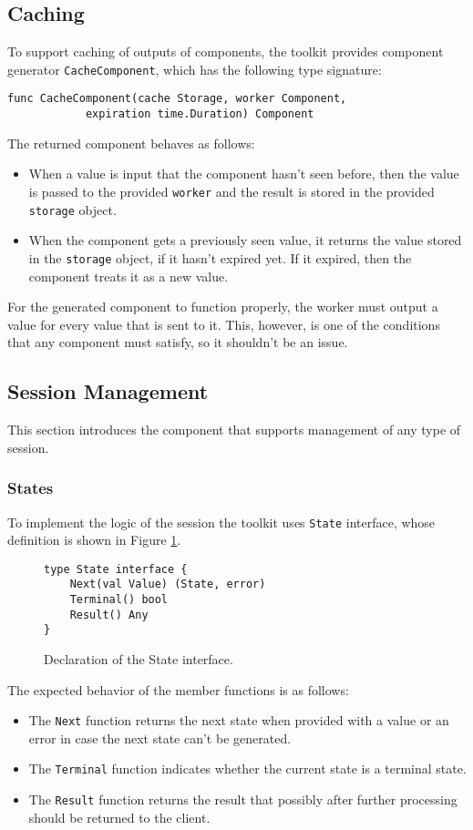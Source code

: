 \subsection{Caching}
To support caching of outputs of components, the toolkit provides
component generator \texttt{CacheComponent}, which has the following type
signature:
\begin{lstlisting}
func CacheComponent(cache Storage, worker Component, 
            expiration time.Duration) Component
\end{lstlisting}
The returned component behaves as follows:
\begin{itemize}
  \item When a value is input that the component hasn't seen before, then
        the value is passed to the provided \texttt{worker} and the result 
        is stored in the provided \texttt{storage} object.

  \item When the component gets a previously seen value, it returns the value
        stored in the \texttt{storage} object, if it hasn't expired yet. If it 
        expired, then the component treats it as a new value.
\end{itemize}

For the generated component to function properly, the worker must output
a value for every value that is sent to it. This, however, is one of the 
conditions that any component must satisfy, so it shouldn't be an issue.

\subsection{Session Management}
This section introduces the component that supports management of any
type of session.
\subsubsection{States}
\label{sec:state}
To implement the logic of the session the toolkit uses \texttt{State}
interface, whose definition is shown in Figure \ref{fig:State}.
\begin{figure}[h]
\centering
\begin{lstlisting}
type State interface {
    Next(val Value) (State, error)
    Terminal() bool
    Result() Any
}
\end{lstlisting}
\caption[scale=1.0]{Declaration of the State interface.}
\label{fig:State}
\end{figure}
The expected behavior of the member functions is as follows:
\begin{itemize}
	\item The \texttt{Next} function returns the next state when provided 
        with a value or an error in case the next state can't be generated.
	\item The \texttt{Terminal} function indicates whether the current 
        state is a terminal state.
	\item The \texttt{Result} function returns the result that possibly 
        after further processing should be returned to the client.
\end{itemize}

